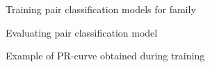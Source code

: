 \documentclass{article}
\begin{document}
			\begin{figure}
				\caption{Training pair classification models for family}
				\label{fig:train_classify1}
			\end{figure}
			
			\begin{figure}
				\caption{Evaluating pair classification model}
				\label{fig:train_classify2}
			\end{figure}
			
			\begin{figure}[h!]
				\caption{Example of PR-curve obtained during training}
				\label{fig:test_PR-curve}
			\end{figure}
		
\end{document}
